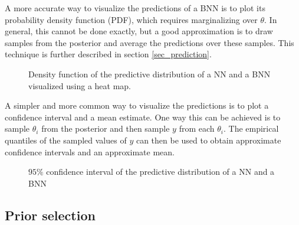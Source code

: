 \documentclass[12pt]{article}
\begin{document}
A more accurate way to visualize the predictions of a BNN is to plot its probability density function (PDF), which requires marginalizing over $\theta$. In general, this cannot be done exactly, but a good approximation is to draw samples from the posterior and average the predictions over these samples. This technique is further described in section \ref{sec_prediction}.

\begin{figure}[H]
\centering
{}
\caption{Density function of the predictive distribution of a NN and a BNN visualized using a heat map.}
\label{fig_1d_predictions_pdf}
\end{figure}

A simpler and more common way to visualize the predictions is to plot a confidence interval and a mean estimate. One way this can be achieved is to sample $\theta_i$ from the posterior and then sample $y$ from each $\theta_i$. The empirical quantiles of the sampled values of $y$ can then be used to obtain approximate confidence intervals and an approximate mean.

\begin{figure}[H]
\centering
{}
\caption{$95\%$ confidence interval of the predictive distribution of a NN and a BNN}
\label{fig_1d_predictions_ci}
\end{figure}

\subsection{Prior selection}
\end{document}
